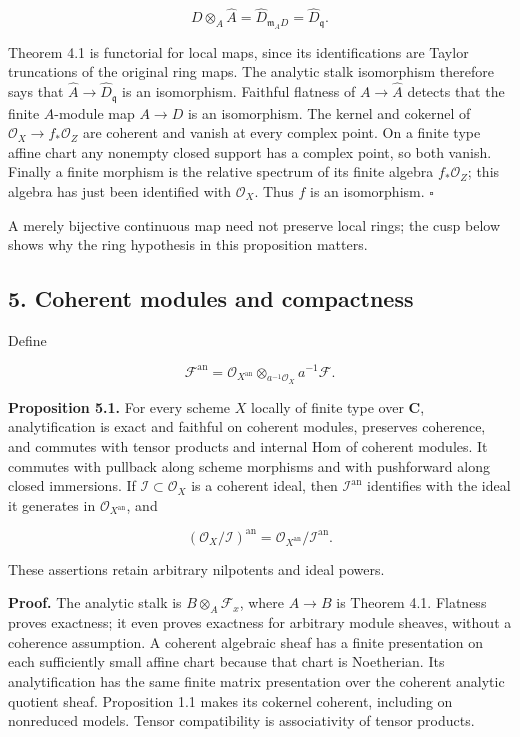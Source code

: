 \documentclass[11pt]{article}
\begin{document}
\[
D\otimes_A\widehat A=\widehat D_{\mathfrak m_AD}
=\widehat D_{\mathfrak q}.
\]

Theorem 4.1 is functorial for local maps, since its identifications are
Taylor truncations of the original ring maps. The analytic stalk
isomorphism therefore says that
\(\widehat A\to\widehat D_{\mathfrak q}\) is an isomorphism. Faithful
flatness of \(A\to\widehat A\) detects that the finite \(A\)-module map
\(A\to D\) is an isomorphism. The kernel and cokernel of
\(\mathcal O_X\to f_*\mathcal O_Z\) are coherent and vanish at every
complex point. On a finite type affine chart any nonempty closed support
has a complex point, so both vanish. Finally a finite morphism is the
relative spectrum of its finite algebra \(f_*\mathcal O_Z\); this
algebra has just been identified with \(\mathcal O_X\). Thus \(f\) is an
isomorphism. \(\square\)

A merely bijective continuous map need not preserve local rings; the
cusp below shows why the ring hypothesis in this proposition matters.

\subsection{5. Coherent modules and
compactness}\label{coherent-modules-and-compactness}

Define

\[
\mathcal F^{\mathrm{an}}
=\mathcal O_{X^{\mathrm{an}}}\otimes_{a^{-1}\mathcal O_X}a^{-1}\mathcal F.
\]

\textbf{Proposition 5.1.} For every scheme \(X\) locally of finite type
over \(\mathbf C\), analytification is exact and faithful on coherent
modules, preserves coherence, and commutes with tensor products and
internal Hom of coherent modules. It commutes with pullback along scheme
morphisms and with pushforward along closed immersions. If
\(\mathcal I\subset\mathcal O_X\) is a coherent ideal, then
\(\mathcal I^{\mathrm{an}}\) identifies with the ideal it generates in
\(\mathcal O_{X^{\mathrm{an}}}\), and

\[
(\mathcal O_X/\mathcal I)^{\mathrm{an}}
=\mathcal O_{X^{\mathrm{an}}}/\mathcal I^{\mathrm{an}}.
\]

These assertions retain arbitrary nilpotents and ideal powers.

\textbf{Proof.} The analytic stalk is \(B\otimes_A\mathcal F_x\), where
\(A\to B\) is Theorem 4.1. Flatness proves exactness; it even proves
exactness for arbitrary module sheaves, without a coherence assumption.
A coherent algebraic sheaf has a finite presentation on each
sufficiently small affine chart because that chart is Noetherian. Its
analytification has the same finite matrix presentation over the
coherent analytic quotient sheaf. Proposition 1.1 makes its cokernel
coherent, including on nonreduced models. Tensor compatibility is
associativity of tensor products.
\end{document}
